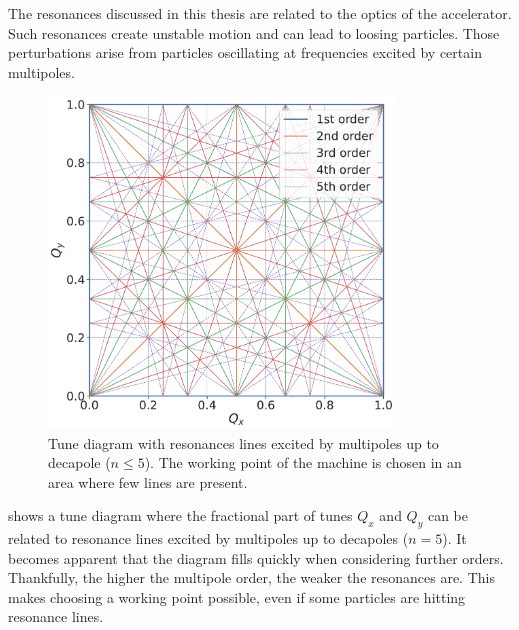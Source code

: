 \section{}


\subsection{}

The resonances discussed in this thesis are related to the optics of the accelerator.
Such resonances create unstable motion and can lead to loosing particles.
Those perturbations arise from particles oscillating at frequencies excited by certain multipoles.

\begin{figure}[!htb]
    \centering
    \includegraphics[width=0.82\textwidth]{images/resonance_diagram_n5.pdf}
    \caption{Tune diagram with resonances lines excited by multipoles up to decapole ($n \leq 5$).
             The working point of the machine is chosen in an area where few lines are present.}
    \label{fig:resonances:diagram_n5}
\end{figure}

 shows a tune diagram where the fractional part of tunes $Q_x$ and
$Q_y$ can be related to resonance lines excited by multipoles up to decapoles ($n=5$).
It becomes apparent that the diagram fills quickly when considering further orders.
Thankfully, the higher the multipole order, the weaker the resonances are. This makes choosing a
working point possible, even if some particles are hitting resonance lines.

